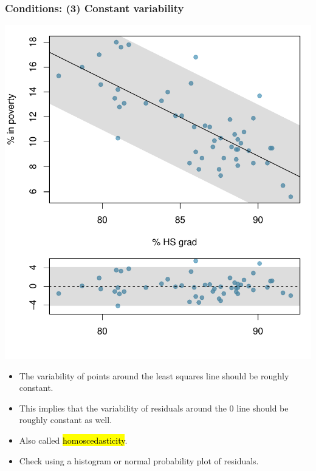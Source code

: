 \begin{frame}
\frametitle{Conditions: (3) Constant variability}

{
\begin{center}
\includegraphics[width=\textwidth]{8-2_least_square_reg/figures/poverty/poverty_hsgrad_tube}
\end{center}
}
{
\begin{itemize}

\item The variability of points around the least squares line should be roughly constant.

\pause

\item This implies that the variability of residuals around the 0 line should be roughly constant as well.

\pause

\item Also called \hl{homoscedasticity}.

\pause

\item Check using a histogram or normal probability plot of residuals.

\end{itemize}
}


\end{frame}

